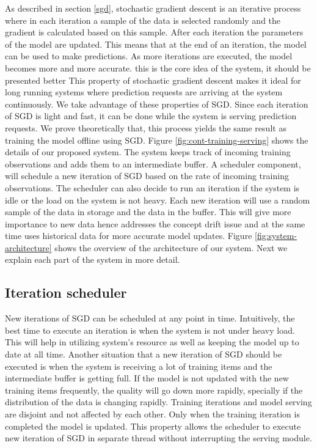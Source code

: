 \documentclass{sig-alternate-05-2015}
\begin{document}
As described in section \ref{sgd}, stochastic gradient descent is an iterative process where in each iteration a sample of the data is selected randomly and the gradient is calculated based on this sample. 
After each iteration the parameters of the model are updated.
This means that at the end of an iteration, the model can be used to make predictions.
As more iterations are executed, the model becomes more and more accurate.
{\color{red} this is the core idea of the system, it should be presented better  }This property of stochastic gradient descent makes it ideal for long running systems where prediction requests are arriving at the system continuously.
We take advantage of these properties of SGD.
Since each iteration of SGD is light and fast, it can be done while the system is serving prediction requests.
We prove theoretically that, this process yields the same result as training the model offline using SGD.
Figure \ref{fig:cont-training-serving} shows the details of our proposed system.
The system keeps track of incoming training observations and adds them to an intermediate buffer. 
A scheduler component, will schedule a new iteration of SGD based on the rate of incoming training observations. 
The scheduler can also decide to run an iteration if the system is idle or the load on the system is not heavy. 
Each new iteration will use a random sample of the data in storage and the data in the buffer. 
This will give more importance to new data hence addresses the concept drift issue and at the same time uses historical data for more accurate model updates.
Figure \ref{fig:system-architecture} shows the overview of the architecture of our system.
Next we explain each part of the system in more detail.

\subsection{Iteration scheduler}
New iterations of SGD can be scheduled at any point in time.
Intuitively, the best time to execute an iteration is when the system is not under heavy load.
This will help in utilizing system's resource as well as keeping the model up to date at all time.
Another situation that a new iteration of SGD should be executed is when the system is receiving a lot of training items and the intermediate buffer is getting full.
If the model is not updated with the new training items frequently, the quality will go down more rapidly, specially if the distribution of the data is changing rapidly.
Training iterations and model serving are disjoint and not affected by each other.
Only when the training iteration is completed the model is updated.
This property allows the scheduler to execute new iteration of SGD in separate thread without interrupting the serving module.
\end{document}
